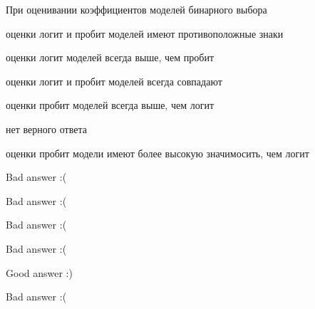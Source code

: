 
\begin{question}
При оценивании коэффициентов моделей бинарного выбора
\begin{answerlist}
  \item оценки логит и пробит моделей имеют противоположные знаки
  \item оценки логит моделей всегда выше, чем пробит
  \item оценки логит и пробит моделей всегда совпадают
  \item оценки пробит моделей всегда выше, чем логит
  \item нет верного ответа
  \item оценки пробит модели имеют более высокую значимосить, чем логит
\end{answerlist}
\end{question}

\begin{solution}
\begin{answerlist}
  \item Bad answer :(
  \item Bad answer :(
  \item Bad answer :(
  \item Bad answer :(
  \item Good answer :)
  \item Bad answer :(
\end{answerlist}
\end{solution}

